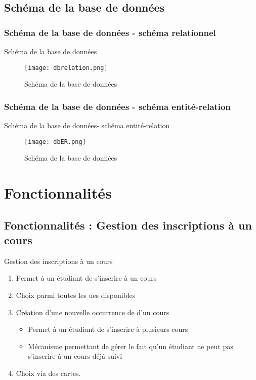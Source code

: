 \documentclass[numbering=fraction,10pt]{beamer}
\begin{document}
\subsection{Schéma de la base de données}
\subsubsection{Schéma de la base de données - schéma relationnel}
\begin{frame}{Schéma de la base de données}
    \begin{figure}
        \centering
        \texttt{[image: dbrelation.png]}
        \caption{Schéma de la base de données}
    \end{figure}
\end{frame}
\subsubsection{Schéma de la base de données - schéma entité-relation}
\begin{frame}{Schéma de la base de données- schéma entité-relation}
    \begin{figure}
        \centering
        \texttt{[image: dbER.png]}
        \caption{Schéma de la base de données}
    \end{figure}
\end{frame}
\section{Fonctionnalités}
\subsection{Fonctionnalités : Gestion des inscriptions à un cours}
\begin{frame}{Gestion des inscriptions à un cours}
    \begin{enumerate}
        \item Permet à un étudiant de s'inscrire à un cours
        \item Choix parmi toutes les ues disponibles
        \item Création d'une nouvelle occurrence de d'un cours
        \begin{itemize}
            \item Permet à un étudiant de s'inscrire à plusieurs cours
            \item Mécanisme permettant de gérer le fait qu'un étudiant ne peut pas s'inscrire à un cours déjà suivi
        \end{itemize}
        \item Choix via des cartes.
    \end{enumerate}
\end{frame}
\end{document}
